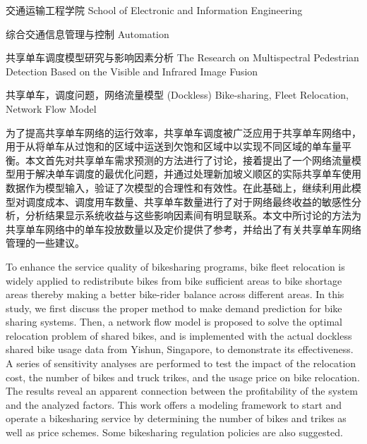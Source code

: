 \documentclass[]{tongjithesis}
\numberwithin{equation}{chapter}
\begin{document}
\school
{交通运输工程学院}
{School of Electronic and Information Engineering}

\major
{综合交通信息管理与控制}
{Automation}

\thesistitle
{共享单车调度模型研究与影响因素分析}
{}
{The Research on Multispectral Pedestrian Detection Based on the Visible and Infrared Image Fusion }
{}




\keyword
{共享单车，调度问题，网络流量模型}
{(Dockless) Bike-sharing, Fleet Relocation, Network Flow Model}



\maketitle



\begin{cabstract}
	为了提高共享单车网络的运行效率，共享单车调度被广泛应用于共享单车网络中，用于从将单车从过饱和的区域中运送到欠饱和区域中以实现不同区域的单车量平衡。本文首先对共享单车需求预测的方法进行了讨论，接着提出了一个网络流量模型用于解决单车调度的最优化问题，并通过处理新加坡义顺区的实际共享单车使用数据作为模型输入，验证了次模型的合理性和有效性。在此基础上，继续利用此模型对调度成本、调度用车数量、共享单车数量进行了对于网络最终收益的敏感性分析，分析结果显示系统收益与这些影响因素间有明显联系。本文中所讨论的方法为共享单车网络中的单车投放数量以及定价提供了参考，并给出了有关共享单车网络管理的一些建议。
\end{cabstract}

\begin{eabstract}
	To enhance the service quality of bikesharing programs, bike fleet relocation is widely applied to redistribute bikes from bike sufficient areas to bike shortage areas thereby making a better bike-rider balance across different areas. In this study, we first discuss the proper method to make demand prediction for bike sharing systems. Then, a network flow model is proposed to solve the optimal relocation problem of shared bikes, and is implemented with the actual dockless shared bike usage data from Yishun, Singapore, to demonstrate its effectiveness. A series of sensitivity analyses are performed to test the impact of the relocation cost, the number of bikes and truck trikes, and the usage price on bike relocation. The results reveal an apparent connection between the profitability of the system and the analyzed factors. This work offers a modeling framework to start and operate a bikesharing service by determining the number of bikes and trikes as well as price schemes. Some bikesharing regulation policies are also suggested.
\end{eabstract}
\end{document}
